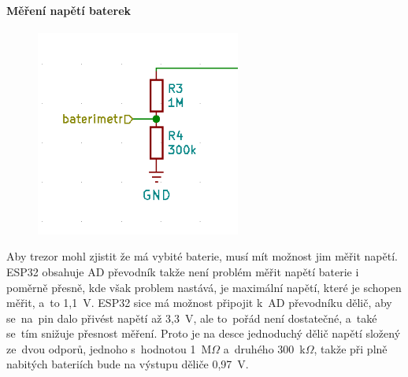 \newpage

\paragraph*{Měření napětí baterek}

\begin{figure}
    \centering
    \includegraphics[width=0.6\textwidth]{kapitoly/obrazky/E4/napajeni/delic_baterimetru.png}
    \caption{\label{fig:frog1}}
\end{figure}

Aby trezor mohl zjistit že má vybité baterie, musí mít možnost jim měřit napětí. ESP32 obsahuje AD převodník takže není problém měřit napětí baterie 
i poměrně přesně, kde však problem nastává, je maximální napětí, které je schopen měřit, a~to 1,1~V. ESP32 sice má možnost připojit k~AD převodníku dělič,
aby se~na~pin dalo přivést napětí až 3,3~V, ale to~pořád není dostatečné, a~také se~tím snižuje přesnost měření. Proto je na desce jednoduchý dělič napětí
složený ze~dvou odporů, jednoho s~hodnotou 1~M$\Omega$ a~druhého 300~k$\Omega$, takže při plně nabitých bateriích bude na výstupu děliče 0,97~V. %

\newpage